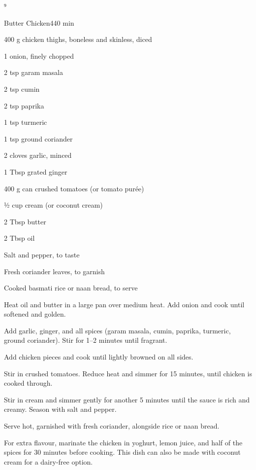 ⁹\begin{recipebox}{Butter Chicken}{4}{40 min}
\begin{ingredients}
  \item 400 g chicken thighs, boneless and skinless, diced
  \item 1 onion, finely chopped
  \item 2 tsp garam masala
  \item 2 tsp cumin
  \item 2 tsp paprika
  \item 1 tsp turmeric
  \item 1 tsp ground coriander
  \item 2 cloves garlic, minced
  \item 1 Tbsp grated ginger
  \item 400 g can crushed tomatoes (or tomato purée)
  \item ½ cup cream (or coconut cream)
  \item 2 Tbsp butter
  \item 2 Tbsp oil
  \item Salt and pepper, to taste
  \item Fresh coriander leaves, to garnish
  \item Cooked basmati rice or naan bread, to serve
\end{ingredients}

\begin{method}
  \item Heat oil and butter in a large pan over medium heat. Add onion and cook until softened and golden.  
  \item Add garlic, ginger, and all spices (garam masala, cumin, paprika, turmeric, ground coriander). Stir for 1–2 minutes until fragrant.  
  \item Add chicken pieces and cook until lightly browned on all sides.  
  \item Stir in crushed tomatoes. Reduce heat and simmer for 15 minutes, until chicken is cooked through.  
  \item Stir in cream and simmer gently for another 5 minutes until the sauce is rich and creamy. Season with salt and pepper.  
  \item Serve hot, garnished with fresh coriander, alongside rice or naan bread.  
\end{method}

\begin{notes}
For extra flavour, marinate the chicken in yoghurt, lemon juice, and half of the spices for 30 minutes before cooking.  
This dish can also be made with coconut cream for a dairy-free option.  
\end{notes}
\end{recipebox}